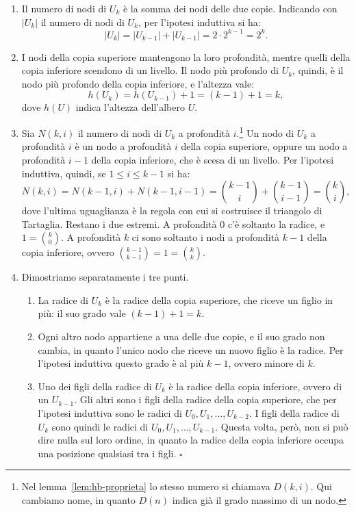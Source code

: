 \begin{enumerate}
    \item Il numero di nodi di $U_k$ è la somma dei nodi delle due copie. Indicando con $|U_k|$ il numero di nodi di $U_k$, per l'ipotesi induttiva si ha:
    \[
    |U_k| = |U_{k-1}| + |U_{k-1}| = 2 \cdot 2^{k-1} = 2^k.
    \]
    \item I nodi della copia superiore mantengono la loro profondità, mentre quelli della copia inferiore scendono di un livello. Il nodo più profondo di $U_k$, quindi, è il nodo più profondo della copia inferiore, e l'altezza vale:
    \[
    h(U_k) = h(U_{k-1}) + 1 = (k-1) + 1 = k,
    \]
    dove $h(U)$ indica l'altezza dell'albero $U$.
    \item Sia $N(k,i)$ il numero di nodi di $U_k$ a profondità $i$.\footnote{Nel lemma~\ref{lem:hb-proprieta} lo stesso numero si chiamava $D(k,i)$. Qui cambiamo nome, in quanto $D(n)$ indica già il grado massimo di un nodo.} Un nodo di $U_k$ a profondità $i$ è un nodo a profondità $i$ della copia superiore, oppure un nodo a profondità $i-1$ della copia inferiore, che è scesa di un livello. Per l'ipotesi induttiva, quindi, se $1 \le i \le k-1$ si ha:
    \[
    N(k,i) = N(k-1,i) + N(k-1,i-1) = \binom{k-1}{i} + \binom{k-1}{i-1} = \binom{k}{i},
    \]
    dove l'ultima uguaglianza è la regola con cui si costruisce il triangolo di Tartaglia. Restano i due estremi. A profondità $0$ c'è soltanto la radice, e $1 = \binom{k}{0}$. A profondità $k$ ci sono soltanto i nodi a profondità $k-1$ della copia inferiore, ovvero $\binom{k-1}{k-1} = 1 = \binom{k}{k}$.
    \item Dimostriamo separatamente i tre punti.
    \begin{enumerate}[label=(\alph*)]
        \item La radice di $U_k$ è la radice della copia superiore, che riceve un figlio in più: il suo grado vale $(k-1) + 1 = k$.
        \item Ogni altro nodo appartiene a una delle due copie, e il suo grado non cambia, in quanto l'unico nodo che riceve un nuovo figlio è la radice. Per l'ipotesi induttiva questo grado è al più $k-1$, ovvero minore di $k$.
        \item Uno dei figli della radice di $U_k$ è la radice della copia inferiore, ovvero di un $U_{k-1}$. Gli altri sono i figli della radice della copia superiore, che per l'ipotesi induttiva sono le radici di $U_0, U_1, \ldots, U_{k-2}$. I figli della radice di $U_k$ sono quindi le radici di $U_0, U_1, \ldots, U_{k-1}$. Questa volta, però, non si può dire nulla sul loro ordine, in quanto la radice della copia inferiore occupa una posizione qualsiasi tra i figli. \hfill $\square$
    \end{enumerate}
\end{enumerate}

